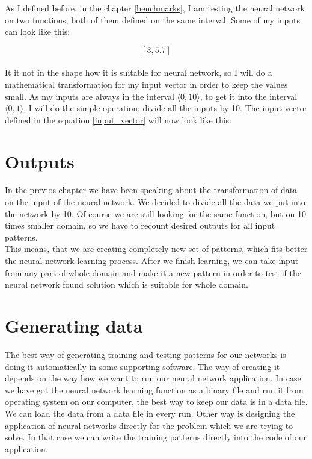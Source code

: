 \documentclass[a4paper,oneside,onecolumn,11pt]{report}
\begin{document}
		As I defined before, in the chapter \ref{benchmarks}, I am testing the neural network on two 
		functions, both of them defined on the same interval. Some of my inputs can look like this:

		\begin{equation}
		\label{input_vector}
			[3, 5.7]
		\end{equation}\\

		It it not in the shape how it is suitable for neural network, so I will do a mathematical 
		transformation for my input vector in order to keep the values small. As my inputs are always
		in the interval $\langle 0, 10 \rangle$, to get it into the interval $\langle 0, 1 \rangle$,
		I will do the simple operation: divide all the inputs by 10. The input vector defined in the 
		equation \ref{input_vector} will now look like this:
		\begin{equation}
			[0.3, 0.57]
		\end{equation}		

	\section{Outputs}
		In the previos chapter we have been speaking about the transformation of data on the input 
		of the neural network. We decided to divide all the data we put into the network by 10.
		Of course we are still looking for the same function, but on 10 times smaller domain, so
		we have to recount desired outputs for all input patterns. \\

		This means, that we are creating completely new set of patterns, which fits better the 
		neural network learning process. After we finish learning, we can take input from any
		part of whole domain and make it a new pattern in order to test if the neural network 
		found solution which is suitable for whole domain.

	\section{Generating data}
		The best way of generating training and testing patterns for our networks is doing it 
		automatically in some supporting software. The way of creating it depends on the way how
		we want to run our neural network application. In case we have got the neural network
		learning function as a binary file and run it from operating system on our computer, 
		the best way to keep our data is in a data file. We can load the data from a data file in
		every run. Other way is designing the application of neural networks directly for the problem 
		which we are trying to solve. In that case we can write the training patterns directly into 
		the code of our application.\\
\end{document}
